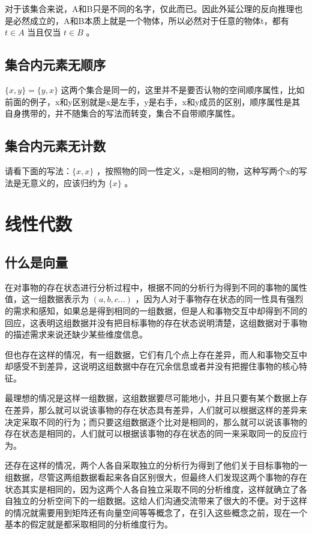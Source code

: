 \documentclass[12pt,oneside]{book}
\begin{document}
对于该集合来说，A和B只是不同的名字，仅此而已。因此外延公理的反向推理也是必然成立的，A和B本质上就是一个物体，所以必然对于任意的物体t，都有 $t \in A$ 当且仅当 $t \in B$ 。


\section{集合内元素无顺序}
$\{x, y\} =\{y, x\}$ 这两个集合是同一的，这里并不是要否认物的空间顺序属性，比如前面的例子，x和y区别就是x是左手，y是右手，x和y成员的区别，顺序属性是其自身携带的，并不随集合的写法而转变，集合不自带顺序属性。

\section{集合内元素无计数}
请看下面的写法：$\{x, x\}$ ，按照物的同一性定义，x是相同的物，这种写两个x的写法是无意义的，应该归约为 $\{x\}$ 。


\chapter{线性代数}
\section{什么是向量}
在对事物的存在状态进行分析过程中，根据不同的分析行为得到不同的事物的属性值，这一组数据表示为 $(a, b, c...)$ ，因为人对于事物存在状态的同一性具有强烈的需求和感知，如果总是得到相同的一组数据，但是人和事物交互中却得到不同的回应，这表明这组数据并没有把目标事物的存在状态说明清楚，这组数据对于事物的描述需求来说还缺少某些维度信息。

但也存在这样的情况，有一组数据，它们有几个点上存在差异，而人和事物交互中却感受不到差异，这说明这组数据中存在冗余信息或者并没有把握住事物的核心特征。

最理想的情况是这样一组数据，这组数据要尽可能地小，并且只要有某个数据上存在差异，那么就可以说该事物的存在状态具有差异，人们就可以根据这样的差异来决定采取不同的行为；而只要这组数据逐个比对是相同的，那么就可以说该事物的存在状态是相同的，人们就可以根据该事物的存在状态的同一来采取同一的反应行为。

还存在这样的情况，两个人各自采取独立的分析行为得到了他们关于目标事物的一组数据，尽管这两组数据看起来各自区别很大，但最终人们发现这两个事物的存在状态其实是相同的，因为这两个人各自独立采取不同的分析维度，这样就确立了各自独立的分析空间下的一组数据。这给人们沟通交流带来了很大的不便。对于这样的情况就需要用到矩阵还有向量空间等等概念了，在引入这些概念之前，现在一个基本的假定就是都采取相同的分析维度行为。
\end{document}
